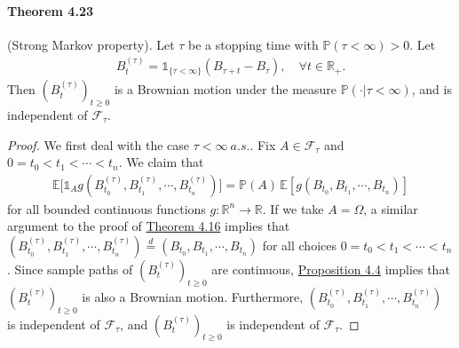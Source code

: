 \documentclass{article}
\numberwithin{equation}{section}
\newcommand{\E}{\mathbb{E}}
\renewcommand{\P}{\mathbb{P}}
\theoremstyle{plain}
\theoremstyle{definition}
\begin{document}
\paragraph{Theorem 4.23\label{thm:4.23}} (Strong Markov property). Let $\tau$ be a stopping time with $\P(\tau<\infty)>0$. Let
\begin{align*}
	B_t^{(\tau)}=\mathds{1}_{\{\tau<\infty\}}(B_{\tau+t}-B_\tau),\quad\forall t\in\mathbb{R}_+.
\end{align*}
Then $(B_t^{(\tau)})_{t\geq 0}$ is a Brownian motion under the measure $\P(\cdot|\tau<\infty)$, and is independent of $\mathscr{F}_\tau$.

\begin{proof}
We first deal with the case $\tau<\infty\ a.s.$. Fix $A\in\mathscr{F}_\tau$ and $0=t_0<t_1<\cdots<t_n$. We claim that
\begin{align*}
	\E\bigl[\mathds{1}_A g(B_{t_0}^{(\tau)},B_{t_1}^{(\tau)},\cdots,B_{t_n}^{(\tau)})\bigr] = \P(A)\,\E\left[g(B_{t_0},B_{t_1},\cdots,B_{t_n})\right]
\end{align*} 
for all bounded continuous functions $g:\mathbb{R}^n\to\mathbb{R}$. If we take $A=\Omega$, a similar argument to the proof of \hyperref[thm:4.16]{Theorem 4.16} implies that $(B_{t_0}^{(\tau)},B_{t_1}^{(\tau)},\cdots,B_{t_n}^{(\tau)})\overset{d}{=}(B_{t_0},B_{t_1},\cdots,B_{t_n})$ for all choices $0=t_0<t_1<\cdots<t_n$. Since sample paths of $(B_t^{(\tau)})_{t\geq 0}$ are continuous, \hyperref[prop:4.4]{Proposition 4.4} implies that $(B_t^{(\tau)})_{t\geq 0}$ is also a Brownian motion. Furthermore, $(B_{t_0}^{(\tau)},B_{t_1}^{(\tau)},\cdots,B_{t_n}^{(\tau)})$ is independent of $\mathscr{F}_\tau$, and $(B_t^{(\tau)})_{t\geq 0}$ is independent of $\mathscr{F}_\tau$.


\end{proof}
\end{document}
